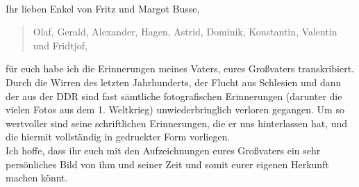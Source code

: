  \leavevmode \\
Ihr lieben Enkel von Fritz und Margot Busse,\\

\begin{quote}
Olaf, Gerald, Alexander, Hagen, Astrid, Dominik, Konstantin, Valentin und Fridtjof,\\
\end{quote}

\noindent
für euch habe ich die Erinnerungen meines Vaters, eures Großvaters transkribiert. Durch die Wirren des letzten Jahrhunderts, der Flucht aus Schlesien und dann der aus der DDR sind fast sämtliche fotografischen Erinnerungen (darunter die vielen Fotos aus dem 1. Weltkrieg) unwiederbringlich verloren gegangen. Um so wertvoller sind seine schriftlichen Erinnerungen, die er uns hinterlassen hat, und die hiermit vollständig in gedruckter Form vorliegen.\\

\noindent
Ich hoffe, dass ihr euch mit den Aufzeichnungen eures Großvaters ein sehr persönliches Bild von ihm und seiner Zeit und somit eurer eigenen Herkunft machen könnt.\\

 \leavevmode \\

